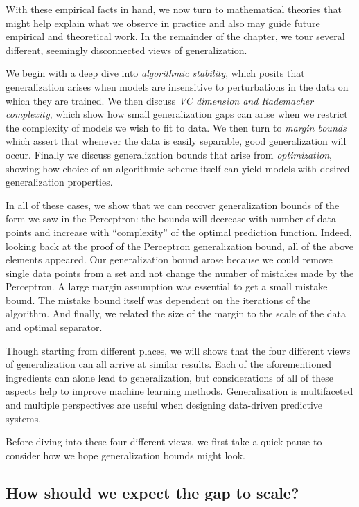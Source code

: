 \documentclass{tufte-book}
\begin{document}
With these empirical facts in hand, we now turn to mathematical theories
that might help explain what we observe in practice and also may guide
future empirical and theoretical work. In the remainder of the chapter,
we tour several different, seemingly disconnected views of
generalization.

We begin with a deep dive into \emph{algorithmic stability}, which
posits that generalization arises when models are insensitive to
perturbations in the data on which they are trained. We then discuss
\emph{VC dimension and Rademacher complexity}, which show how small
generalization gaps can arise when we restrict the complexity of models
we wish to fit to data. We then turn to \emph{margin bounds} which
assert that whenever the data is easily separable, good generalization
will occur. Finally we discuss generalization bounds that arise from
\emph{optimization}, showing how choice of an algorithmic scheme itself
can yield models with desired generalization properties.

In all of these cases, we show that we can recover generalization bounds
of the form we saw in the Perceptron: the bounds will decrease with
number of data points and increase with ``complexity'' of the optimal
prediction function. Indeed, looking back at the proof of the Perceptron
generalization bound, all of the above elements appeared. Our
generalization bound arose because we could remove single data points
from a set and not change the number of mistakes made by the Perceptron.
A large margin assumption was essential to get a small mistake bound.
The mistake bound itself was dependent on the iterations of the
algorithm. And finally, we related the size of the margin to the scale
of the data and optimal separator.

Though starting from different places, we will shows that the four
different views of generalization can all arrive at similar results.
Each of the aforementioned ingredients can alone lead to generalization,
but considerations of all of these aspects help to improve machine
learning methods. Generalization is multifaceted and multiple
perspectives are useful when designing data-driven predictive systems.

Before diving into these four different views, we first take a quick
pause to consider how we hope generalization bounds might look.

\hypertarget{how-should-we-expect-the-gap-to-scale}{%
\subsection{How should we expect the gap to
scale?}\label{how-should-we-expect-the-gap-to-scale}}
\end{document}
